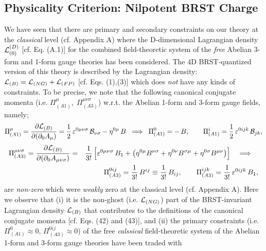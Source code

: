 \documentclass[12pt]{article}
\begin{document}


\subsection{Physicality Criterion: Nilpotent BRST Charge}






We have seen that there are primary and secondary constraints on our theory at the {\it classical} level (cf. Appendix A) where the
D-dimensional Lagrangian density ${\cal L}_{(0)}^{(D)} $ [cf. Eq. (A.1)] for the combined field-theoretic system of the 
{\it free} Abelian 3-form and 1-form gauge 
theories has been considered. The 4D BRST-quantized version of this theory is described by the Lagrangian density: ${\cal L}_{(B)} 
=  {\cal L}_{(NG)} + {\cal L}_{(FP)}$ [cf. Eqs. (1),(3)] which does {\it not} have any kinds of constraints. To be precise, we note that the 
following canonical conjugate momenta (i.e. $\Pi^{\mu}_{(A1)}, \; \Pi^{\mu\nu\sigma}_{(A3)}$)
w.r.t. the Abelian 1-form  and 3-form gauge fields, namely;
\begin{eqnarray}\label{42}
\Pi^{\mu}_{(A1)} = \frac {\partial {\cal L}_{(B)}}{\partial (\partial_0 A_{\mu})} = 
\dfrac{1}{2}\, \varepsilon^{0\mu\nu\sigma}\, {\cal B}_{\nu\sigma} - \eta^{0\mu}\, B \;\;\Longrightarrow \;\; \Pi^{0}_{(A1)}  = -\, B, \qquad
\Pi^{i}_{(A1)} = \dfrac{1}{2}\, \varepsilon^{0ijk}\, {\cal B}_{jk}, 
\end{eqnarray}
\begin{eqnarray}\label{43}
\Pi^{\mu\nu\sigma}_{(A3)} = \frac {\partial {\cal L}_{(B)}}{\partial (\partial_0 A_{\mu\nu\sigma})} &=& \frac {1}{3!}\, 
\Big [ \varepsilon^{0\mu\nu\sigma}\, B_1 + \big (\eta^{0\mu} B^{\nu\sigma} + \eta^{0\nu} B^{\sigma\mu} + \eta^{0\sigma} B^{\mu\nu} \big ) \Big ]
\quad \Longrightarrow \quad 
\nonumber\\
&& \Pi^{0ij}_{(A3)}  = \frac {1}{3!}\, B^{ij} \equiv \frac {1}{3!}\, B_{ij}, \qquad \Pi^{ijk}_{(A3)}  = \frac {1}{3!}\,\varepsilon^{0ijk}\, B_1,
\end{eqnarray}
are {\it non-zero} which were {\it weakly} zero at the classical level (cf. Appendix A). Here we observe that 
(i) it is the non-ghost (i.e. ${\cal L}_{(NG)} $) part of the BRST-invariant Lagrangian density  ${\cal L}_{(B)}$
that contributes to the definitions of the canonical conjugate momenta [cf. Eqs. (42) and (43)], and (ii) the primary constraints (i.e. $\Pi^{0}_{(A1)}  \approx 0,\,
\Pi^{0ij}_{(A3)} \approx 0$) of the free {\it calssical} field-theoretic system of the Abelian 1-form and 3-form gauge theories have been traded with
\end{document}
